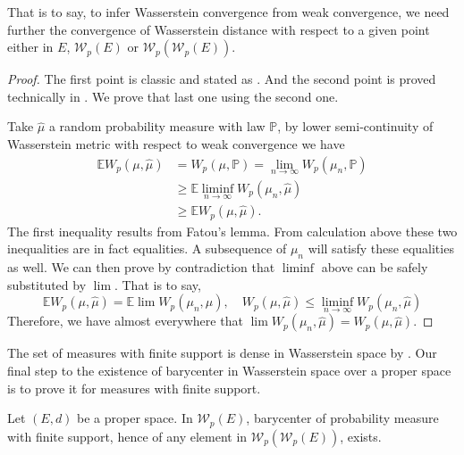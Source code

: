 That is to say,
to infer Wasserstein convergence from weak convergence,
we need further the convergence of Wasserstein distance with respect to a given point
either in $E$, $\mathcal{W}_p(E)$ or $\mathcal{W}_p(\mathcal{W}_p(E))$.

\begin{proof}
	The first point is classic and stated as .
	And	the second point is proved technically in \cite[Lemma 14]{le2017existence}.
	We prove that last one using the second one.

	Take $\hat{\mu}$ a random probability measure with law $\mathbb{P}$,
	by lower semi-continuity of Wasserstein metric with respect to weak convergence we have
	\begin{align*}
		\mathbb{E}W_p(\mu, \hat{\mu}) & =W_p(\mu, \mathbb{P})=\lim_{n \rightarrow \infty} W_p(\mu_n, \mathbb{P}) \\
		                              & \geq \mathbb{E}\liminf_{n \rightarrow \infty} W_p(\mu_n, \hat{\mu})      \\
		                              & \geq \mathbb{E}W_p(\mu, \hat{\mu}).
	\end{align*}
	The first inequality results from Fatou's lemma.
	From calculation above these two inequalities are in fact equalities.
	A subsequence of $\mu_n$ will satisfy these equalities as well.
	We can then prove by contradiction that $\liminf$ above can be safely substituted by $\lim$.
	That is to say,
	\[
		\mathbb{E}W_p(\mu, \hat{\mu}) = \mathbb{E}\lim W_p(\mu_n, \hat{\mu}),
		\quad W_p(\mu, \hat{\mu}) \leq \liminf_{n \rightarrow \infty} W_p(\mu_n, \hat{\mu})
	\]
	Therefore, we have almost everywhere that $\lim W_p(\mu_n, \hat{\mu})=W_p(\mu, \hat{\mu})$.
\end{proof}

The set of measures with finite support is dense in Wasserstein space by .
Our final step to the existence of barycenter in Wasserstein space over a proper space
is to prove it for measures with finite support.

\begin{thm}
	\label{thm:barycenter_finite_support_measure}
	Let $(E,d)$ be a proper space.
	In $\mathcal{W}_p(E)$, barycenter of probability measure with finite support,
	hence of any element in $\mathcal{W}_p(\mathcal{W}_p(E))$,
	exists.
\end{thm}

